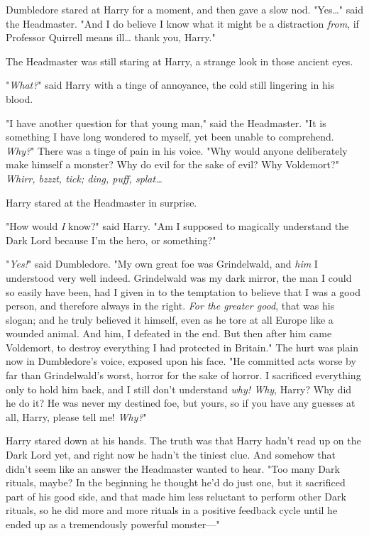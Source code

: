 Dumbledore stared at Harry for a moment, and then gave a slow nod.
"Yes{\ldots}" said the Headmaster. "And I do believe I know what it might be a
distraction \emph{from}, if Professor Quirrell means ill{\ldots} thank you,
Harry."

The Headmaster was still staring at Harry, a strange look in those ancient eyes.

"\emph{What?}" said Harry with a tinge of annoyance, the cold still lingering
in his blood.

"I have another question for that young man," said the Headmaster. "It is
something I have long wondered to myself, yet been unable to comprehend.
\emph{Why?}" There was a tinge of pain in his voice. "Why would anyone
deliberately make himself a monster? Why do evil for the sake of evil? Why
Voldemort?"
\later
\emph{Whirr, bzzzt, tick; ding, puff, splat{\ldots}}

Harry stared at the Headmaster in surprise.

"How would \emph{I} know?" said Harry. "Am I supposed to magically understand
the Dark Lord because I'm the hero, or something?"

"\emph{Yes!}" said Dumbledore. "My own great foe was Grindelwald, and
\emph{him} I understood very well indeed. Grindelwald was my dark mirror, the
man I could so easily have been, had I given in to the temptation to believe
that I was a good person, and therefore always in the right. \emph{For the
greater good}, that was his slogan; and he truly believed it himself, even as
he tore at all Europe like a wounded animal. And him, I defeated in the end.
But then after him came Voldemort, to destroy everything I had protected in
Britain." The hurt was plain now in Dumbledore's voice, exposed upon his face.
"He committed acts worse by far than Grindelwald's worst, horror for the sake
of horror. I sacrificed everything only to hold him back, and I still don't
understand \emph{why! Why}, Harry? Why did he do it? He was never my destined
foe, but yours, so if you have any guesses at all, Harry, please tell me!
\emph{Why?}"

Harry stared down at his hands. The truth was that Harry hadn't read up on the
Dark Lord yet, and right now he hadn't the tiniest clue. And somehow that
didn't seem like an answer the Headmaster wanted to hear. "Too many Dark
rituals, maybe? In the beginning he thought he'd do just one, but it sacrificed
part of his good side, and that made him less reluctant to perform other Dark
rituals, so he did more and more rituals in a positive feedback cycle until he
ended up as a tremendously powerful monster---"

